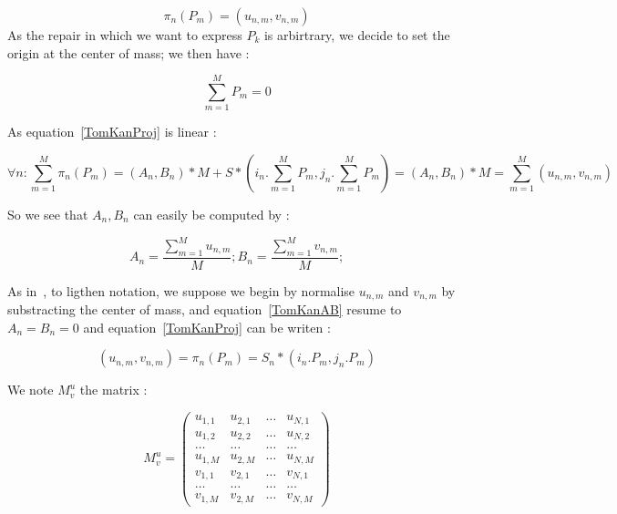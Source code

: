 \begin{equation}
    \pi_n(P_m) = (u_{n,m},v_{n,m})
\end{equation}
As the repair in which we want to express $P_k$ is arbirtrary, we decide to  set the 
origin at the center of mass; we then have   :


\begin{equation}
   \sum_{m=1}^{M} P_m = 0 \label{TomKanCDM}
\end{equation}

As equation~\ref{TomKanProj} is linear : 


\begin{equation}
     \forall n : \sum_{m=1}^{M} \pi_n(P_m)  
     =  (A_n,B_n) * M + S *(i_n. \sum_{m=1}^{M} P_m,j_n. \sum_{m=1}^{M} P_m)
     = (A_n,B_n) * M
     = \sum_{m=1}^{M} (u_{n,m},v_{n,m})
\end{equation}

So we see that $A_n,B_n$ can easily be computed by  :


\begin{equation}
   A_n = \frac{\sum_{m=1}^{M}u_{n,m}}{M} ;
   B_n = \frac{\sum_{m=1}^{M}v_{n,m}}{M} ; \label{TomKanAB}
\end{equation}

As in~\cite{tomasi1992shape}, to ligthen notation, we suppose we begin by normalise $u_{n,m}$ and $v_{n,m}$ 
by substracting the center of mass, and equation~\ref{TomKanAB} resume to $A_n=B_n=0$ and
equation~\ref{TomKanProj} can be writen :


\begin{equation}
   (u_{n,m},v_{n,m}) =  \pi_n(P_m) =   S_n * (i_n . P_m, j_n.P_m) \label{TomKanProj2}
\end{equation}


We note $M^u_v$ the matrix :


\begin{equation}
M^u_v=
\left( \begin{array}{cccc} 
             u_{1,1} & u_{2,1}  & \dots & u_{N,1} \\ 
             u_{1,2} & u_{2,2}  & \dots & u_{N,2} \\
              \dots &  \dots  & \dots &   \dots   \\
             u_{1,M} & u_{2,M}  & \dots & u_{N,M} \\
             v_{1,1} & v_{2,1}  & \dots & v_{N,1} \\ 
              \dots &  \dots  & \dots &   \dots   \\
             v_{1,M} & v_{2,M}  & \dots & v_{N,M} 
        \end{array} 
\right)
\label{TomKanMuv}
\end{equation}

